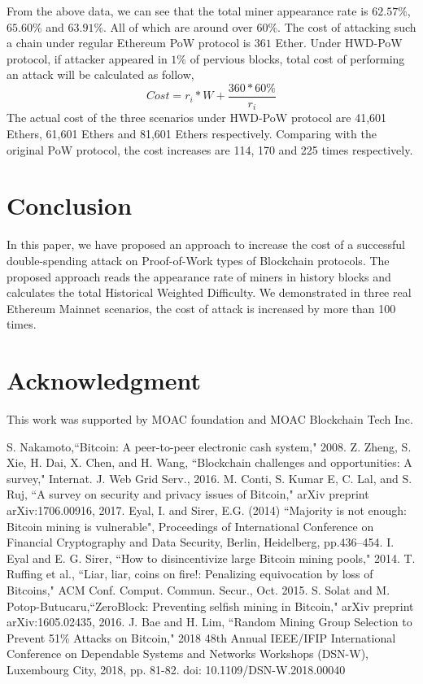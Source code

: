 \documentclass[conference]{IEEEtran}
\begin{document}
From the above data, we can see that the total miner appearance rate is $62.57\%$, $65.60\%$ and $63.91\%$. All of which are around over $60\%$. The cost of attacking such a chain under regular Ethereum PoW protocol is $361$ Ether. Under HWD-PoW protocol, if attacker appeared in $1\%$ of pervious blocks, total cost of performing an attack will be calculated as follow,
\begin{equation}
    Cost = r_i * W + \frac{360 * 60\%}{r_i}\label{eq}
\end{equation}
The actual cost of the three scenarios under HWD-PoW protocol are 41,601 Ethers, 61,601 Ethers and 81,601 Ethers respectively. Comparing with the original PoW protocol, the cost increases are 114, 170 and 225 times respectively.

\section{Conclusion}

In this paper, we have proposed an approach to increase the cost of a successful double-spending attack on Proof-of-Work types of Blockchain protocols. The proposed approach reads the appearance rate of miners in history blocks and calculates the total Historical Weighted Difficulty. We demonstrated in three real Ethereum Mainnet scenarios, the cost of attack is increased by more than 100 times.

\section*{Acknowledgment}

This work was supported by MOAC foundation and MOAC Blockchain Tech Inc.

\begin{thebibliography}{00}

 S. Nakamoto,``Bitcoin: A peer-to-peer electronic cash system," 2008.
 Z. Zheng, S. Xie, H. Dai, X. Chen, and H. Wang, ``Blockchain challenges
and opportunities: A survey," Internat. J. Web Grid Serv., 2016.
M. Conti, S. Kumar E, C. Lal, and S. Ruj, ``A survey on security and privacy issues of Bitcoin," arXiv preprint arXiv:1706.00916, 2017.
 Eyal, I. and Sirer, E.G. (2014) ``Majority is not enough: Bitcoin mining is vulnerable", Proceedings
of International Conference on Financial Cryptography and Data Security, Berlin, Heidelberg,
pp.436–454.
 I. Eyal and E. G. Sirer, ``How to disincentivize large Bitcoin mining pools," 2014.
 T. Ruffing et al., “Liar, liar, coins on fire!: Penalizing equivocation by loss of Bitcoins," ACM Conf. Comput. Commun. Secur., Oct. 2015.
 S. Solat and M. Potop-Butucaru,``ZeroBlock: Preventing selfish mining in Bitcoin," arXiv preprint arXiv:1605.02435, 2016.
 J. Bae and H. Lim, ``Random Mining Group Selection to Prevent 51\% Attacks on Bitcoin," 2018 48th Annual IEEE/IFIP International Conference on Dependable Systems and Networks Workshops (DSN-W), Luxembourg City, 2018, pp. 81-82.
doi: 10.1109/DSN-W.2018.00040
\end{thebibliography}
\vspace{12pt}
\color{red}
\end{document}
